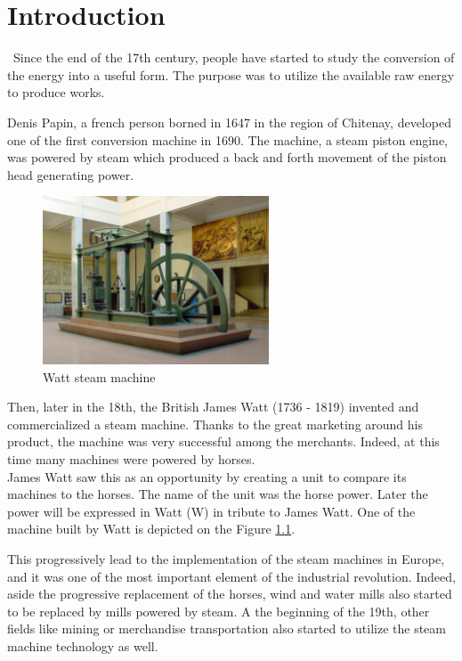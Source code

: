 \graphicspath{{Chapitre_2/Images/}}
\chapter{Introduction}\label{introduction}
\quad\, Since the end of the 17th century, people have started to study the conversion of the energy into a useful form. The purpose was to utilize the available raw energy to produce works.

Denis Papin, a french person borned in 1647 in the region of Chitenay, developed one of the first conversion machine in 1690. The machine, a steam piston engine, was powered by steam which produced a back and forth movement of the piston head generating power. 

\begin{figure}[h]
    \centering
    \includegraphics[width=0.6\textwidth]{Chapitre_1/Images/Maquina_vapor_Watt_ETSIIM.jpg}
    \caption{Watt steam machine\cite{Watt}}
    \label{fig:Watt}
\end{figure}

Then, later in the 18th, the British James Watt (1736 - 1819) invented and commercialized a steam machine. Thanks to the great marketing around his product, the machine was very successful among the merchants. Indeed, at this time many machines were powered by horses.\\

James Watt saw this as an opportunity by creating a unit to compare its machines to the horses. The name of the unit was the horse power. Later the power will be expressed in Watt (W) in tribute to James Watt. One of the machine built by Watt is depicted on the Figure \ref{fig:Watt}.

This progressively lead to the implementation of the steam machines in Europe, and it was one of the most important element of the industrial revolution. Indeed, aside the progressive replacement of the horses, wind and water mills also started to be replaced by mills powered by steam. A the beginning of the 19th, other fields like mining or merchandise transportation also started to utilize the steam machine technology as well.

